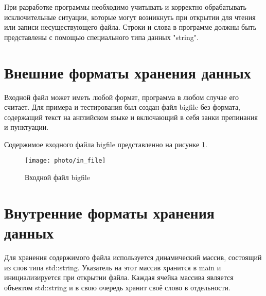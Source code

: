 \documentclass[12pt,a4paper]{article}%
\begin{document}
При разработке программы необходимо учитывать и корректно
обрабатывать исключительные ситуации, которые могут возникнуть при
открытии для чтения или записи несуществующего файла.
Строки и слова в программе должны быть представлены с помощью
специального типа данных "string".

\begin{comment}
В этот раздел можно поместить копию цели и задания на курсовую
работу, а также указаний по её выполнению.
\end{comment}

\newpage

\section{Внешние форматы хранения данных}
\setcounter{figure}{0}
\begin{comment}
В этом разделе пояснительной записки нужно будет описать содержание
входных и выходных файлов, используемых в программе. При описании
нужно будет указать, из каких частей (компонент) состоит каждый файл и
где в нём будут располагаться требуемые данные.
\end{comment}
Входной файл может иметь любой формат, программа в любом случае его считает. Для примера и тестирования был создан файл bigfile без формата, содержащий текст на английском языке и включающий в себя занки препинания и пунктуации. 

Содержимое входного файла bigfile представленно на рисунке \ref{in_file}.


\begin{figure}[h!]
		\centering
		\texttt{[image: photo/in\_file]}
		\caption{Входной файл bigfile}
		\label{in_file}
\end{figure}
\newpage
\section{Внутренние форматы хранения данных}
\setcounter{figure}{0}
\begin{comment}
В
этом
разделе
пояснительной
записки
нужно
будет
привести
графические рисунки, описывающие используемые структуры данных для
всех значимых переменных программы.
\end{comment}
Для хранения содержимого файла используется динамический массив, состоящий из слов типа std::string. Указатель на этот массив хранится в main и инициализируется при открытии файла. Каждая ячейка массива является объектом std::string и в свою очередь хранит своё слово в отдельности.
\end{document}
